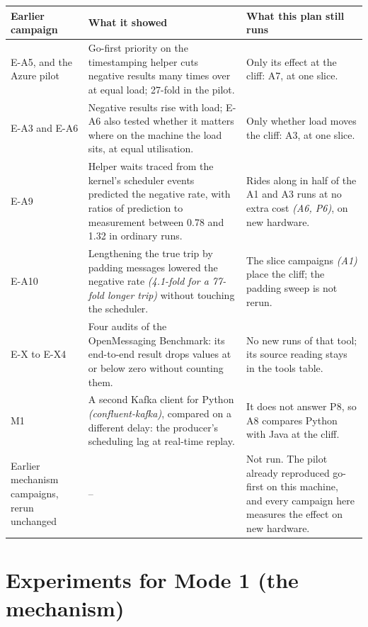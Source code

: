 \documentclass[11pt]{article}
\newcommand{\gl}[1]{{\color{soft}\itshape\small (#1)}}
\begin{document}
{\small
\begin{longtable}{@{}>{\raggedright\arraybackslash}p{2.9cm} >{\raggedright\arraybackslash}p{6.5cm} >{\raggedright\arraybackslash}p{6.4cm}@{}}
\toprule
\textbf{Earlier campaign} & \textbf{What it showed} & \textbf{What this plan still runs} \\
\midrule
\endhead
E-A5, and the Azure pilot & Go-first priority on the timestamping helper cuts negative results many times over at equal load; 27-fold in the pilot. & Only its effect at the cliff: A7, at one slice. \\
E-A3 and E-A6 & Negative results rise with load; E-A6 also tested whether it matters where on the machine the load sits, at equal utilisation. & Only whether load moves the cliff: A3, at one slice. \\
E-A9 & Helper waits traced from the kernel's scheduler events predicted the negative rate, with ratios of prediction to measurement between 0.78 and 1.32 in ordinary runs. & Rides along in half of the A1 and A3 runs at no extra cost \gl{A6, P6}, on new hardware. \\
E-A10 & Lengthening the true trip by padding messages lowered the negative rate \gl{4.1-fold for a 77-fold longer trip} without touching the scheduler. & The slice campaigns \gl{A1} place the cliff; the padding sweep is not rerun. \\
E-X to E-X4 & Four audits of the OpenMessaging Benchmark: its end-to-end result drops values at or below zero without counting them. & No new runs of that tool; its source reading stays in the tools table. \\
M1 & A second Kafka client for Python \gl{confluent-kafka}, compared on a different delay: the producer's scheduling lag at real-time replay. & It does not answer P8, so A8 compares Python with Java at the cliff. \\
Earlier mechanism campaigns, rerun unchanged & -- & Not run. The pilot already reproduced go-first on this machine, and every campaign here measures the effect on new hardware. \\
\bottomrule
\end{longtable}}

\section{Experiments for Mode 1 (the mechanism)}\label{sec:mode1}
\end{document}
